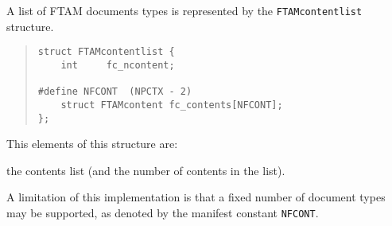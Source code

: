A list of FTAM documents types is represented by the \verb"FTAMcontentlist"
structure.
\begin{quote}\small\begin{verbatim}
struct FTAMcontentlist {
    int     fc_ncontent;

#define NFCONT  (NPCTX - 2)
    struct FTAMcontent fc_contents[NFCONT];
};
\end{verbatim}\end{quote}
This elements of this structure are:
\begin{describe}
\item[\verb"fc\_contents"/\verb"fc\_ncontent":] the contents list
(and the number of contents in the list).
\end{describe}
A limitation of this implementation is that a fixed number of document types
may be supported,
as denoted by the manifest constant \verb"NFCONT".

